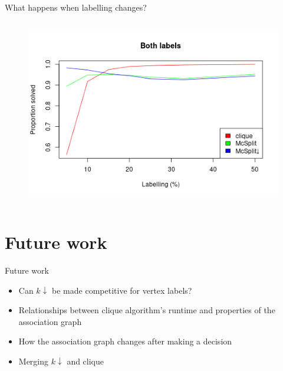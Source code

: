 \documentclass{beamer}
\begin{document}
\begin{frame}{What happens when labelling changes?}
\begin{columns}
\begin{column}{0.5\textwidth}
      \begin{figure}
        \centering
        \includegraphics[width=\textwidth]{../dissertation/images/both_labels_linechart.png}
      \end{figure}
    \end{column}
  \end{columns}
\end{frame}

\section{Future work}
\begin{frame}{Future work}
  \begin{itemize}
  \item Can $k\downarrow$ be made competitive for vertex labels?
  \item Relationships between clique algorithm's runtime and properties of the
    association graph
  \item How the association graph changes after making a decision
  \item Merging $k\downarrow$ and clique
  \end{itemize}
\end{frame}
\end{document}
